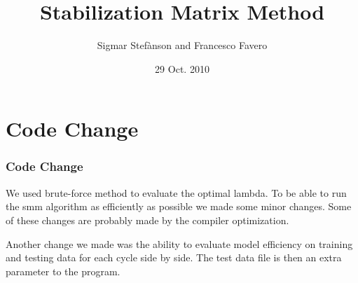 \documentclass[presentation]{beamer}   %
\begin{document}

\author{Sigmar Stef\`{a}nson and Francesco Favero}
\title{Stabilization Matrix Method}
\date{29 Oct. 2010}



\begin{frame}
  \maketitle
\end{frame}


\section{Code Change}
\begin{frame}
  \frametitle{Code Change}
  \begin{block}\centering
  	We used brute-force method to evaluate the optimal lambda. To be able to run the smm algorithm as efficiently as possible we made some minor changes. Some of these changes are probably made by the compiler optimization.
  \end{block}
   \pause
  \begin{block}\centering
  	Another change we made was the ability to evaluate model efficiency on training and testing data for each cycle side by side. The test data file is then an extra parameter to the program.
  \end{block}
\end{frame}
\end{document}
